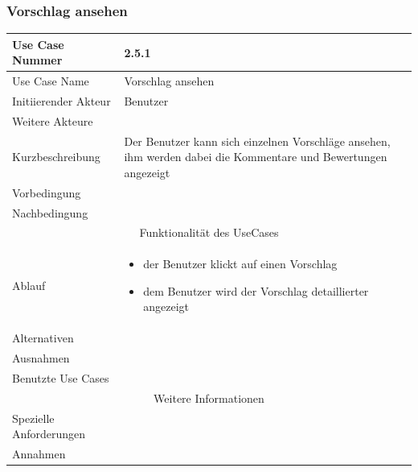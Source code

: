 \documentclass[10pt,a4paper]{article}
\begin{document}
\subsubsection{Vorschlag ansehen}
		\begin{tabular}{|l|p{.5\linewidth}|}
		\hline Use Case Nummer & 2.5.1 \\ 
		\hline Use Case Name & Vorschlag ansehen \\ 
		\hline Initiierender Akteur & Benutzer \\
		\hline Weitere Akteure &  \\
		\hline Kurzbeschreibung & Der Benutzer kann sich einzelnen Vorschl\"age ansehen, ihm werden dabei die Kommentare und Bewertungen angezeigt \\
		\hline Vorbedingung &  \\
		\hline Nachbedingung &  \\
		\hline \multicolumn{2}{|c|}{Funktionalität des UseCases}\\
		\hline Ablauf & \begin{itemize}
			\item der Benutzer klickt auf einen Vorschlag
			\item dem Benutzer wird der Vorschlag detaillierter angezeigt
		\end{itemize} \\
		\hline Alternativen &  \\
		\hline Ausnahmen &  \\
		\hline Benutzte Use Cases &  \\
		\hline \multicolumn{2}{|c|}{Weitere Informationen} \\
		\hline Spezielle Anforderungen &  \\
		\hline Annahmen &  \\
		\hline
		\end{tabular}
\end{document}
